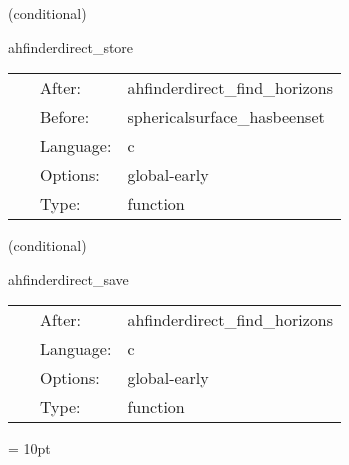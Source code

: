 \vspace{5mm}

   (conditional) 

\hspace{5mm} ahfinderdirect\_store 

\hspace{5mm}{\it store apparent horizon(s) into spherical surface(s) } 


\hspace{5mm}

 \begin{tabular*}{160mm}{cll} 
~ & After:  & ahfinderdirect\_find\_horizons \\ 
~ & Before:  & sphericalsurface\_hasbeenset \\ 
~ & Language:  & c \\ 
~ & Options:  & global-early \\ 
~ & Type:  & function \\ 
\end{tabular*} 


\vspace{5mm}

   (conditional) 

\hspace{5mm} ahfinderdirect\_save 

\hspace{5mm}{\it save apparent horizon(s) into cactus variables } 


\hspace{5mm}

 \begin{tabular*}{160mm}{cll} 
~ & After:  & ahfinderdirect\_find\_horizons \\ 
~ & Language:  & c \\ 
~ & Options:  & global-early \\ 
~ & Type:  & function \\ 
\end{tabular*} 



\vspace{5mm}\parskip = 10pt 

